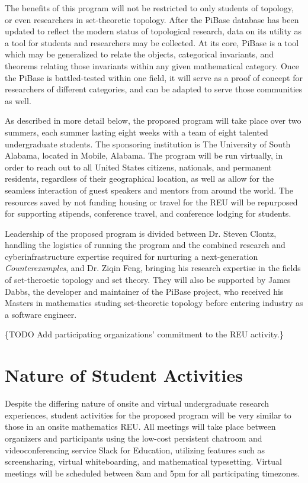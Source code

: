   The benefits of this program will not be restricted to only students of
  topology, or even researchers in set-theoretic topology. After the
  PiBase database has been updated to reflect the modern status of topological
  research, data on its utility as a tool for students and researchers may
  be collected. At its core, PiBase is a tool which may be generalized
  to relate the objects, categorical invariants, and theorems relating those
  invariants within any given mathematical category. Once the PiBase is
  battled-tested within one field, it will serve as a proof of concept for
  researchers of different categories, and can be adapted to serve those
  communities as well.

  As described in more detail below, the proposed program will take place
  over two summers, each summer lasting eight weeks
  with a team of eight talented undergraduate
  students. The sponsoring institution is The University of South
  Alabama, located in Mobile, Alabama. The program will be run virtually,
  in order to reach out to all United States citizens, nationals, and
  permanent residents, regardless of their geographical location,
  as well as allow for the seamless interaction of guest speakers and mentors
  from around the world. The resources saved by not funding housing or
  travel for the REU will be repurposed for supporting stipends,
  conference travel, and conference lodging for students.

  Leadership of the proposed program is divided between Dr. Steven Clontz,
  handling the logistics of running the program and the combined
  research and cyberinfrastructure
  expertise required for nurturing a next-generation \textit{Counterexamples},
  and Dr. Ziqin Feng, bringing his research expertise in the fields of set-theroetic
  topology and set theory. They will also be supported by James Dabbs, the
  developer and maintainer of the PiBase project, who received his Masters
  in mathematics studing set-theoretic topology before entering industry as
  a software engineer.

  \{TODO Add participating organizations'
  commitment to the REU activity.\}

\section{Nature of Student Activities}

  Despite the differing nature of onsite and virtual undergraduate research
  experiences, student activities for the proposed program will be very similar
  to those in an onsite mathematics REU. All meetings will take place
  between organizers and participants using the low-cost persistent chatroom
  and videoconferencing service Slack for Education, utilizing features such
  as screensharing, virtual whiteboarding, and mathematical typesetting.
  Virtual meetings will be scheduled between 8am and 5pm for all
  participating timezones.

